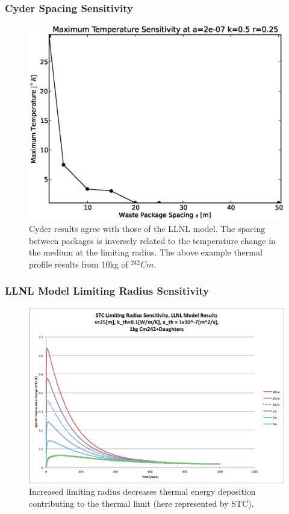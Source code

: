 \begin{frame}[ctb!]
\frametitle{Cyder Spacing Sensitivity}
\begin{figure}[htbp!]
\begin{center}
\includegraphics[height=0.7\textheight]{./thermal_demonstration/spacing/spacing.eps}
\end{center}
\caption[Spacing Sensitivity in Cyder]
{Cyder results agree with those of the LLNL model. The spacing between packages 
is inversely related to the temperature change in the medium at the limiting 
radius. The above example thermal profile results from 10kg of $^{242}Cm$.}
\label{fig:rs}
\end{figure}
\end{frame}

\begin{frame}[ctb!]
\frametitle{LLNL Model Limiting Radius Sensitivity}
\begin{figure}[htbp!]
\begin{center}
\includegraphics[height=0.7\textheight]{./thermal_demonstration/spacing/Cm242r_lim_sens.eps}
\end{center}
\caption[$K_{th}$ Sensitivity to $r_{lim}$]{Increased limiting radius 
decreases thermal energy deposition contributing to the thermal limit
(here represented by STC).}
\label{fig:Cm242r_lim_sens}
\end{figure}
\end{frame}

